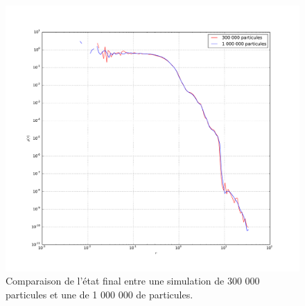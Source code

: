 		\begin{figure}
			\begin{center}
				\includegraphics[width=\textwidth]{graphe/comparison_between_310part.pdf}
				\caption{Comparaison de l'état final entre une simulation de 300 000 particules et une de 1 000 000 de particules.}
				\label{simu::graphe::densitecomp}
			\end{center}
		\end{figure}

